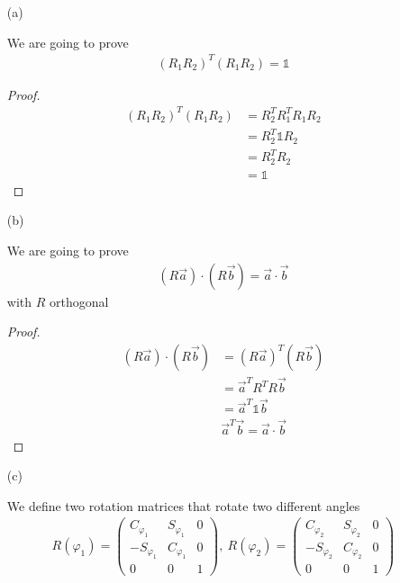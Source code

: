 \documentclass[11pt,a4paper]{article}
\begin{document}
\begin{enumerate}

\item[(a)]

We are going to prove
\begin{align*}
(R_1R_2)^T(R_1R_2)=\mathbb{1}
\end{align*}

\begin{proof}

\begin{align*}
(R_1R_2)^T(R_1R_2)
&=R_2^T R_1^T R_1 R_2 \\
&=R_2^T \mathbb{1} R_2 \\
&=R_2^T R_2 \\
&=\mathbb{1}
\end{align*}

\end{proof}

\item[(b)]

We are going to prove
\begin{align*}
(R\vec{a})\cdot(R\vec{b})=\vec{a}\cdot\vec{b}
\end{align*}
with $R$ orthogonal

\begin{proof}

\begin{align*}
(R\vec{a})\cdot(R\vec{b})
&=(R\vec{a})^T(R\vec{b}) \\
&=\vec{a}^T R^T R \vec{b} \\
&=\vec{a}^T \mathbb{1} \vec{b} \\
&\vec{a}^T \vec{b}=\vec{a}\cdot\vec{b}
\end{align*}

\end{proof}

\newpage

\item[(c)]

We define two rotation matrices that rotate two different angles
\begin{align*}
R(\varphi_1)=
\begin{pmatrix}
C_{\varphi_1} & S_{\varphi_1} & 0 \\
-S_{\varphi_1} & C_{\varphi_1} & 0 \\
0 & 0 & 1
\end{pmatrix},\ 
R(\varphi_2)=
\begin{pmatrix}
C_{\varphi_2} & S_{\varphi_2} & 0 \\
-S_{\varphi_2} & C_{\varphi_2} & 0 \\
0 & 0 & 1
\end{pmatrix}
\end{align*}


\end{enumerate}
\end{document}
